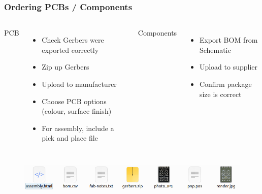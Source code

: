 \documentclass[aspectratio=169, t]{beamer}
\begin{document}
\begin{frame}
\frametitle{Ordering PCBs / Components}
\begin{columns}
	PCB
	\begin{itemize}
		\item Check Gerbers were exported correctly
		\item Zip up Gerbers
		\item Upload to manufacturer
		\item Choose PCB options (colour, surface finish)
		\item For assembly, include a pick and place file
	\end{itemize}
	
	Components
	\begin{itemize}
		\item Export BOM from Schematic
		\item Upload to supplier
		\item Confirm package size is correct
	\end{itemize}
	
\end{columns}
\vspace{5mm}
\begin{figure}
	\includegraphics[width=\linewidth]{images/exported-files.png}
\end{figure}
\end{frame}
\end{document}
